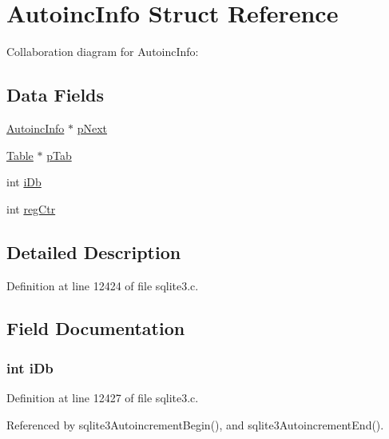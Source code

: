 \hypertarget{struct_autoinc_info}{}\section{Autoinc\+Info Struct Reference}
\label{struct_autoinc_info}


Collaboration diagram for Autoinc\+Info\+:
\subsection*{Data Fields}
\begin{DoxyCompactItemize}
\item 
\hyperlink{struct_autoinc_info}{Autoinc\+Info} $\ast$ \hyperlink{struct_autoinc_info_a02d0456863b04e2e0a5fbda5d737db51}{p\+Next}
\item 
\hyperlink{struct_table}{Table} $\ast$ \hyperlink{struct_autoinc_info_a11b1abc167f386db2ab7fc634c880c26}{p\+Tab}
\item 
int \hyperlink{struct_autoinc_info_ad5da55f1bf334f91b2f63a6a63be348b}{i\+Db}
\item 
int \hyperlink{struct_autoinc_info_a3cbb3487804a896dffcc588df2c08900}{reg\+Ctr}
\end{DoxyCompactItemize}


\subsection{Detailed Description}


Definition at line 12424 of file sqlite3.\+c.



\subsection{Field Documentation}
\hypertarget{struct_autoinc_info_ad5da55f1bf334f91b2f63a6a63be348b}{}
\subsubsection[{i\+Db}]{\setlength{\rightskip}{0pt plus 5cm}int i\+Db}\label{struct_autoinc_info_ad5da55f1bf334f91b2f63a6a63be348b}


Definition at line 12427 of file sqlite3.\+c.



Referenced by sqlite3\+Autoincrement\+Begin(), and sqlite3\+Autoincrement\+End().

